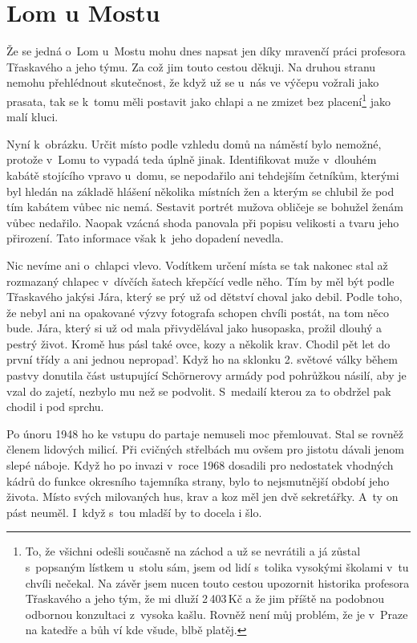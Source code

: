
\def\poznamka{To, že všichni odešli současně na záchod a už se nevrátili a já
zůstal s~popsaným lístkem u~stolu sám, jsem od lidí s~tolika vysokými školami
v~tu chvíli nečekal. Na závěr jsem nucen touto cestou upozornit historika
profesora Třaskavého a jeho tým, že mi dluží 2\,403\,Kč a že jim příště na
podobnou odbornou konzultaci z~vysoka kašlu. Rovněž není můj problém, že je
v~Praze na katedře a bůh ví kde všude, blbě platěj.}

\chapter{Lom u Mostu}

Že se jedná o~Lom u~Mostu mohu dnes napsat jen díky mravenčí práci profesora
Třaskavého a jeho týmu. Za což jim touto cestou děkuji. Na druhou stranu nemohu
přehlédnout skutečnost, že když už se u~nás ve výčepu vožrali jako prasata, tak
se k~tomu měli postavit jako chlapi a ne zmizet bez placení\footnote{\poznamka}
jako malí kluci.

Nyní k~obrázku. Určit místo podle vzhledu domů na náměstí bylo nemožné, protože
v~Lomu to vypadá teda úplně jinak. Identifikovat muže v~dlouhém kabátě
stojícího vpravo u~domu, se nepodařilo ani tehdejším četníkům, kterými byl
hledán na základě hlášení několika místních žen a kterým se chlubil že pod tím
kabátem vůbec nic nemá. Sestavit portrét mužova obličeje se bohužel ženám vůbec
nedařilo. Naopak vzácná shoda panovala při popisu velikosti a tvaru jeho
přirození. Tato informace však k~jeho dopadení nevedla.

Nic nevíme ani o~chlapci vlevo. Vodítkem určení místa se tak nakonec stal až
rozmazaný chlapec v~dívčích šatech křepčící vedle něho. Tím by měl být podle
Třaskavého jakýsi Jára, který se prý už od dětství choval jako debil. Podle
toho, že nebyl ani na opakované výzvy fotografa schopen chvíli postát, na tom
něco bude. Jára, který si už od mala přivydělával jako husopaska, prožil dlouhý
a pestrý život. Kromě hus pásl také ovce, kozy a několik krav. Chodil pět let
do první třídy a ani jednou nepropad'. Když ho na sklonku 2. světové války během
pastvy donutila část ustupující Schörnerovy armády pod pohrůžkou násilí, aby je
vzal do zajetí, nezbylo mu než se podvolit. S~medailí kterou za to obdržel pak
chodil i pod sprchu.

Po únoru 1948 ho ke vstupu do partaje nemuseli moc přemlouvat. Stal se rovněž
členem lidových milicí. Při cvičných střelbách mu ovšem pro jistotu dávali
jenom slepé náboje. Když ho po invazi v~roce 1968 dosadili pro nedostatek
vhodných kádrů do funkce okresního tajemníka strany, bylo to nejsmutnější
období jeho života. Místo svých milovaných hus, krav a koz měl jen dvě
sekretářky. A~ty on pást neuměl. I~když s~tou mladší by to docela i šlo.

